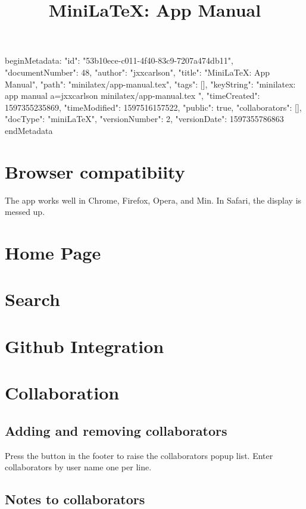 beginMetadata:
{
    "id": "53b10ece-c011-4f40-83c9-7207a474db11",
    "documentNumber": 48,
    "author": "jxxcarlson",
    "title": "MiniLaTeX: App Manual",
    "path": "minilatex/app-manual.tex",
    "tags": [],
    "keyString": "minilatex: app manual a=jxxcarlson minilatex/app-manual.tex ",
    "timeCreated": 1597355235869,
    "timeModified": 1597516157522,
    "public": true,
    "collaborators": [],
    "docType": "miniLaTeX",
    "versionNumber": 2,
    "versionDate": 1597355786863
}
endMetadata

\title{MiniLaTeX: App Manual}

\maketitle

\tableofcontents


\section{Browser compatibiity}

The app works well in Chrome, Firefox, Opera, and Min.   In Safari, the display is messed up.


\section{Home Page}

\section{Search}

\section{Github Integration}


\section{Collaboration}

\subsection{Adding and removing collaborators}

Press the  button in the footer to raise the collaborators popup list.  Enter collaborators by user name one per line.


\subsection{Notes to collaborators}

